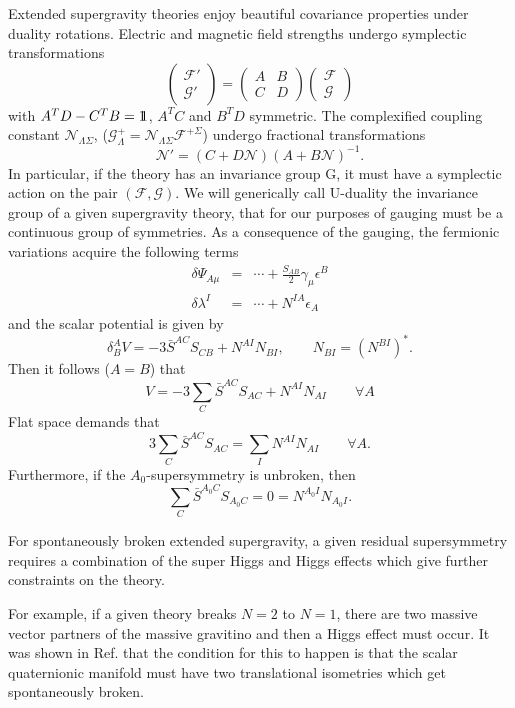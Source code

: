 \documentclass[a4paper,12pt]{article}
\begin{document}
Extended supergravity theories enjoy beautiful covariance properties under duality rotations. Electric and 
magnetic field 
strengths undergo symplectic transformations
$$\begin{pmatrix} \mathcal{F}'\\\mathcal{G}'\end{pmatrix}=\begin{pmatrix} A&B\\C&D\end{pmatrix}
\begin{pmatrix} \mathcal{F}\\\mathcal{G}\end{pmatrix}$$
with $A^TD-C^TB=\relax{\rm 1\kern-.35em 1}$, $A^TC$ and $B^TD$  symmetric.
The complexified coupling constant $\mathcal{N}_{\Lambda\Sigma}$, 
($\mathcal{G}^+_\Lambda=\mathcal{N}_{\Lambda\Sigma}\mathcal{F}^{+\Sigma}$) undergo fractional transformations 
\cite{cdfvp}
$$\mathcal{N}'=(C+D\mathcal{N})(A+B\mathcal{N})^{-1}.$$ In particular, if the theory has an invariance group G, 
it must 
have a symplectic action \cite{gz} on the pair $(\mathcal{F},\mathcal{G})$. We will generically call U-duality 
the invariance group of 
a given supergravity theory, that for our purposes of gauging must be a continuous group of symmetries. As a 
consequence of 
the gauging, the fermionic variations acquire the following terms \cite{df}
\begin{eqnarray*}\delta\Psi_{A\mu}&=&\cdots +\frac{S_{AB}}{2}\gamma_\mu\epsilon^B\\
\delta\lambda^I&=&\cdots +N^{IA}\epsilon_A\end{eqnarray*}
and the scalar potential is given by \cite{fm,cgp}
$$\delta_B^AV=-3\bar S^{AC}S_{CB} +N^{AI}N_{BI}, \qquad N_{BI}=(N^{BI})^*.$$
Then it follows ($A=B$) that
$$V=-3\sum_C\bar S^{AC}S_{AC}+N^{AI}N_{AI} \qquad \forall A$$
Flat space demands that 
$$3\sum_C\bar S^{AC}S_{AC}=\sum_IN^{AI}N_{AI} \qquad \forall A.$$
Furthermore, if the $A_0$-supersymmetry is unbroken, then 
$$\sum_C\bar S^{A_0C}S_{A_0C}=0=N^{A_0I}N_{A_0I}.$$

For spontaneously broken extended supergravity, a given residual supersymmetry requires a combination of the 
super Higgs 
and Higgs effects which give further constraints on the theory. 

For example, if a given theory breaks $N=2$ to $N=1$, there are two massive vector partners of the massive 
gravitino and 
then a Higgs effect must occur. It was shown in Ref. \cite{lo} that the condition for this to happen is that 
the scalar 
quaternionic manifold must have two translational isometries which get spontaneously broken. 
\end{document}
